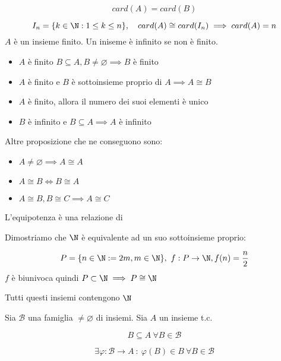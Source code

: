 \documentclass[../appunti.tex]{subfiles}
\begin{document}
\begin{equation}
	card(A)=card(B)
\end{equation}
\bda

\begin{equation}
	I_n = \{ k \in \N : 1 \leq k \leq n \}, \quad card(A) \cong card(I_n)
	\implies card(A) = n
\end{equation}
$A$ è un insieme finito. Un iniseme è infinito se non è finito. 

\begin{itemize}
	\item $A$ è finito $ B \subseteq A, B \neq \varnothing \implies B$ è finito
	\item $A$ è finito e $B$ è sottoinsieme proprio di $A \implies A \cong B$
	\item $A$ è finito, allora il numero dei suoi elementi è unico
	\item $B$ è infinito e $ B \subseteq A \implies A$ è infinito
\end{itemize}
Altre proposizione che ne conseguono sono:

\begin{itemize} 
	\item $A \neq \varnothing \implies A \cong A$
	\item $A \cong B \iff B \cong A$
	\item $ A \cong B, B \cong C \implies A \cong C$
\end{itemize}
L'equipotenza è una relazione di 

\begin{defn}[ $ \N $ è infinito]
Dimostriamo che $ \N $ è equivalente ad un suo sottoinsieme proprio: 

\begin{equation} 
	P = \{ n \in \N : = 2m, m \in \N \}, \
	f: P \to \N, f(n) = \frac{n}{2}
\end{equation}
$f$ è biunivoca quindi $ P \subset \N \implies P \cong \N $ 
\end{defn}

\begin{defn}
Tutti questi insiemi contengono $ \N $ 
\end{defn}

\begin{defn}
Sia $\mathcal{B}$ una famiglia $ \neq \varnothing$ di insiemi. Sia $A$ un insieme t.c.

\begin{equation}
	B \subseteq A \ \forall B \in \mathcal{B}
\end{equation}
\bda

\begin{equation}
	\exists \varphi: \mathcal{B} \to A\ :\ \varphi(B) \in B \ \forall B \in \mathcal{B}
\end{equation}

\end{defn}
\end{document}
